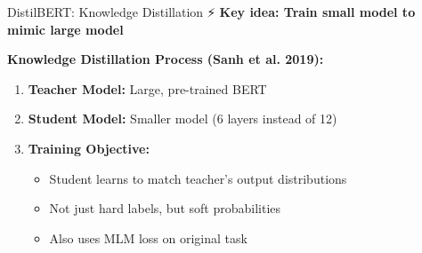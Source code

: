\documentclass[aspectratio=169]{beamer}
\begin{document}
\begin{frame}[shrink=10]{DistilBERT: Knowledge Distillation ⚡}
\textbf{Key idea: Train small model to mimic large model}

\vspace{1em}

\textbf{Knowledge Distillation Process (Sanh et al. 2019):}

\begin{enumerate}\setlength{\itemsep}{0pt}
    \item \textbf{Teacher Model:} Large, pre-trained BERT
    \item \textbf{Student Model:} Smaller model (6 layers instead of 12)
    \item \textbf{Training Objective:}
    \begin{itemize}\setlength{\itemsep}{0pt}
        \item Student learns to match teacher's output distributions
        \item Not just hard labels, but soft probabilities
        \item Also uses MLM loss on original task
    \end{itemize}
\end{enumerate}

\vspace{1em}

\begin{center}
\end{center}
\end{frame}
\end{document}
